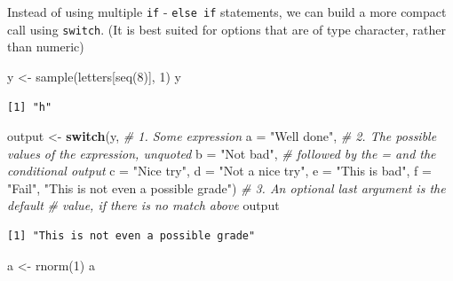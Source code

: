 \documentclass[
]{book}
\newenvironment{Shaded}{\begin{snugshade}}{\end{snugshade}}
\newcommand{\AttributeTok}[1]{\textcolor[rgb]{0.77,0.63,0.00}{#1}}
\newcommand{\CommentTok}[1]{\textcolor[rgb]{0.56,0.35,0.01}{\textit{#1}}}
\newcommand{\ControlFlowTok}[1]{\textcolor[rgb]{0.13,0.29,0.53}{\textbf{#1}}}
\newcommand{\DecValTok}[1]{\textcolor[rgb]{0.00,0.00,0.81}{#1}}
\newcommand{\FunctionTok}[1]{\textcolor[rgb]{0.00,0.00,0.00}{#1}}
\newcommand{\NormalTok}[1]{#1}
\newcommand{\OtherTok}[1]{\textcolor[rgb]{0.56,0.35,0.01}{#1}}
\newcommand{\StringTok}[1]{\textcolor[rgb]{0.31,0.60,0.02}{#1}}
\begin{document}
Instead of using multiple \texttt{if} - \texttt{else\ if} statements, we can build a more compact call using \texttt{switch}. (It is best suited for options that are of type character, rather than numeric)

\begin{Shaded}
\begin{Highlighting}[]
\NormalTok{y }\OtherTok{\textless{}{-}} \FunctionTok{sample}\NormalTok{(letters[}\FunctionTok{seq}\NormalTok{(}\DecValTok{8}\NormalTok{)], }\DecValTok{1}\NormalTok{)}
\NormalTok{y}
\end{Highlighting}
\end{Shaded}

\begin{verbatim}
[1] "h"
\end{verbatim}

\begin{Shaded}
\begin{Highlighting}[]
\NormalTok{output }\OtherTok{\textless{}{-}} \ControlFlowTok{switch}\NormalTok{(y,                      }\CommentTok{\# 1. Some expression}
                 \AttributeTok{a =} \StringTok{"Well done"}\NormalTok{,        }\CommentTok{\# 2. The possible values of the expression, unquoted}
                 \AttributeTok{b =} \StringTok{"Not bad"}\NormalTok{,          }\CommentTok{\#    followed by the \textasciigrave{}=\textasciigrave{} and the conditional output}
                 \AttributeTok{c =} \StringTok{"Nice try"}\NormalTok{,}
                 \AttributeTok{d =} \StringTok{"Not a nice try"}\NormalTok{,}
                 \AttributeTok{e =} \StringTok{"This is bad"}\NormalTok{,}
                 \AttributeTok{f =} \StringTok{"Fail"}\NormalTok{,}
                 \StringTok{"This is not even a possible grade"}\NormalTok{) }\CommentTok{\# 3. An optional last argument is the default}
                                                      \CommentTok{\#    value, if there is no match above}
\NormalTok{output}
\end{Highlighting}
\end{Shaded}

\begin{verbatim}
[1] "This is not even a possible grade"
\end{verbatim}

\begin{Shaded}
\begin{Highlighting}[]
\NormalTok{a }\OtherTok{\textless{}{-}} \FunctionTok{rnorm}\NormalTok{(}\DecValTok{1}\NormalTok{)}
\NormalTok{a}
\end{Highlighting}
\end{Shaded}
\end{document}
